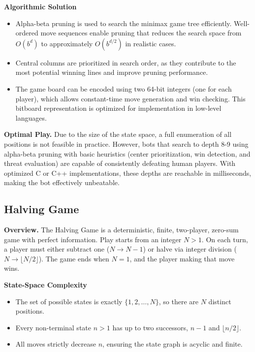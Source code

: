 \documentclass[12pt]{article}
\begin{document}
\noindent\textbf{Algorithmic Solution}
\begin{itemize}
  \item Alpha-beta pruning is used to search the minimax game tree efficiently. Well-ordered move sequences enable pruning that reduces the search space from $O(b^d)$ to approximately $O(b^{d/2})$ in realistic cases.
  \item Central columns are prioritized in search order, as they contribute to the most potential winning lines and improve pruning performance.
  \item The game board can be encoded using two 64-bit integers (one for each player), which allows constant-time move generation and win checking. This bitboard representation is optimized for implementation in low-level languages.
\end{itemize}

\noindent\textbf{Optimal Play.}  
Due to the size of the state space, a full enumeration of all positions is not feasible in practice. However, bots that search to depth 8-9 using alpha-beta pruning with basic heuristics (center prioritization, win detection, and threat evaluation) are capable of consistently defeating human players. With optimized C or C++ implementations, these depths are reachable in milliseconds, making the bot effectively unbeatable.

\subsection{Halving Game}

\textbf{Overview.}  
The Halving Game is a deterministic, finite, two-player, zero-sum game with perfect information. Play starts from an integer $N>1$. On each turn, a player must either subtract one ($N\to N-1$) or halve via integer division ($N\to\lfloor N/2\rfloor$). The game ends when $N=1$, and the player making that move wins.

\vspace{1em}

\noindent\textbf{State-Space Complexity}
\begin{itemize}
  \item The set of possible states is exactly $\{1,2,\dots,N\}$, so there are $N$ distinct positions.
  \item Every non-terminal state $n>1$ has up to two successors, $n-1$ and $\lfloor n/2\rfloor$.
  \item All moves strictly decrease $n$, ensuring the state graph is acyclic and finite.
\end{itemize}
\end{document}

